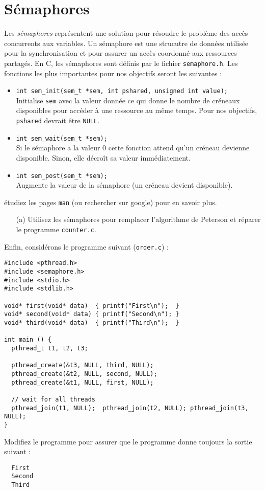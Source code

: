 \documentclass[11pt]{article}
\begin{document}
\section{Sémaphores}

Les \emph{sémaphores} représentent une solution pour résoudre le
problème des accès concurrents aux variables. Un sémaphore est
une strucutre de données utilisée pour la synchronisation et pour
assurer un accès coordonné aux ressources partagés. En C,
les sémaphores sont définis par le fichier
\texttt{semaphore.h}. Les fonctions les plus importantes pour nos
objectifs seront les suivantes :
%
\begin{itemize}
\item
  \verb|int sem_init(sem_t *sem, int pshared, unsigned int value);|\\
  Initialise \verb|sem| avec la valeur donnée ce qui donne le nombre
  de créneaux disponibles pour accéder à une ressource au même temps.
  Pour nos objectifs, \verb|pshared| devrait être \verb|NULL|.
\item \verb|int sem_wait(sem_t *sem);|\\ Si le sémaphore a la valeur 0
  cette fonction attend qu'un créneau devienne disponible. Sinon,
  elle décroît sa valeur immédiatement.
\item \verb|int sem_post(sem_t *sem);|\\ Augmente la valeur de la
  sémaphore (un créneau devient disponible).
\end{itemize}
%
étudiez les pages \verb|man| (ou rechercher sur google) pour en savoir plus.

\begin{enumerate}
\item[(a)] Utilisez les sémaphores pour remplacer l'algorithme de Peterson et réparer le programme \texttt{counter.c}.
\end{enumerate}

Enfin, considérons le programme suivant (\texttt{order.c}) :
\begin{verbatim}
#include <pthread.h>
#include <semaphore.h>
#include <stdio.h>
#include <stdlib.h>

void* first(void* data)  { printf("First\n");  }
void* second(void* data) { printf("Second\n"); }
void* third(void* data)  { printf("Third\n");  }

int main () {
  pthread_t t1, t2, t3;

  pthread_create(&t3, NULL, third, NULL);
  pthread_create(&t2, NULL, second, NULL);
  pthread_create(&t1, NULL, first, NULL);

  // wait for all threads
  pthread_join(t1, NULL);  pthread_join(t2, NULL); pthread_join(t3, NULL);
}
\end{verbatim}
Modifiez le programme pour assurer que le programme donne toujours la
 sortie suivant :
\begin{verbatim}
  First
  Second
  Third
\end{verbatim}
\end{document}
